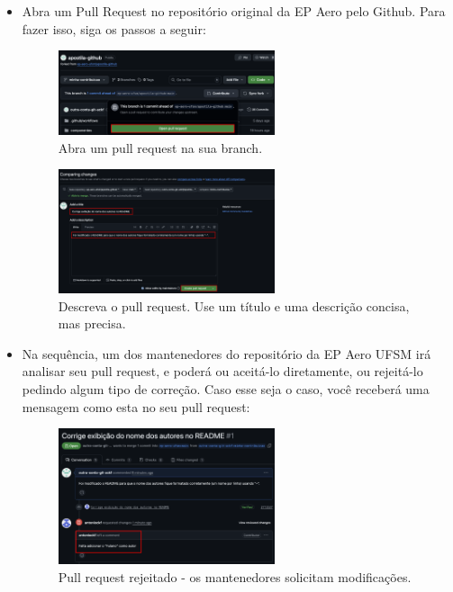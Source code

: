\begin{itemize}
        \item Abra um Pull Request no repositório original da EP Aero pelo Github. Para fazer isso, siga os passos a seguir:

    \begin{figure}[H]
        \centering
        \includegraphics[width=0.6\textwidth]{imgs/tutorial_contribuicao/abrir_pull_request.png}
        \caption{Abra um pull request na sua branch.}
        \label{fig:abrir_pr}
    \end{figure}

    \begin{figure}[H]
        \centering
        \includegraphics[width=0.6\textwidth]{imgs/tutorial_contribuicao/configurando_pull_request.png}
        \caption{Descreva o pull request. Use um título e uma descrição concisa, mas precisa.}
        \label{fig:configurar_pr}
    \end{figure}

    \item Na sequência, um dos mantenedores do repositório da EP Aero UFSM irá analisar seu pull request, e poderá ou aceitá-lo diretamente, ou rejeitá-lo pedindo algum tipo de correção. Caso esse seja o caso, você receberá uma mensagem como esta no seu pull request:

    \begin{figure}[H]
        \centering
        \includegraphics[width=0.6\textwidth]{imgs/tutorial_contribuicao/pr_rejeitado.png}
        \caption{Pull request rejeitado - os mantenedores solicitam modificações.}
        \label{fig:pr_rejeitado}
    \end{figure}


\end{itemize}
